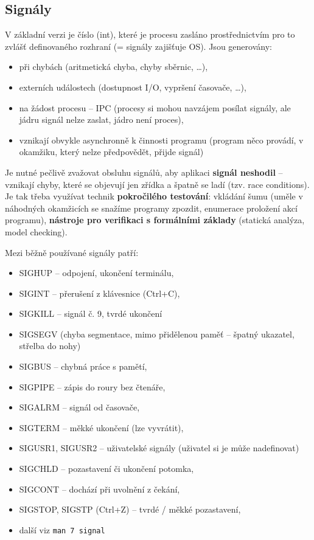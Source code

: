 \documentclass[a4paper, 11pt]{article}
\newcommand{\tcmd}[1]{\texttt{#1}}
\begin{document}
\subsection{Signály}
V základní verzi je číslo (int), které je procesu zasláno prostřednictvím pro to zvlášť definovaného rozhraní (= signály zajišťuje OS). Jsou generovány:
\begin{itemize}
    \item při chybách (aritmetická chyba, chyby sběrnic, \ldots),
    \item externích událostech (dostupnost I/O, vypršení časovače, \ldots),
    \item na žádost procesu -- IPC (procesy si mohou navzájem posílat signály, ale jádru signál nelze zaslat, jádro není proces),
    \item vznikají obvykle asynchronně k činnosti programu (program něco provádí, v okamžiku, který nelze předpovědět, přijde signál) \\
\end{itemize}
 
Je nutné pečlivě zvažovat obsluhu signálů, aby aplikaci \textbf{signál neshodil} -- vznikají chyby, které se objevují jen zřídka a špatně se ladí (tzv. race conditions). Je tak třeba využívat technik \textbf{pokročilého testování}: vkládání šumu (uměle v náhodných okamžicích se snažíme programy zpozdit, enumerace proložení akcí programu), \textbf{nástroje pro verifikaci s formálními základy} (statická analýza, model checking).
 
Mezi běžně používané signály patří:
\begin{itemize}
    \item SIGHUP -- odpojení, ukončení terminálu,
    \item SIGINT -- přerušení z klávesnice (Ctrl+C),
    \item SIGKILL -- signál č. 9, tvrdé ukončení
    \item SIGSEGV (chyba segmentace, mimo přidělenou paměť -- špatný ukazatel, střelba do nohy)
    \item SIGBUS -- chybná práce s pamětí,
    \item SIGPIPE -- zápis do roury bez čtenáře,
    \item SIGALRM -- signál od časovače,
    \item SIGTERM -- měkké ukončení (lze vyvrátit),
    \item SIGUSR1, SIGUSR2 -- uživatelské signály (uživatel si je může nadefinovat)
    \item SIGCHLD -- pozastavení či ukončení potomka,
    \item SIGCONT -- dochází při uvolnění z čekání,
    \item SIGSTOP, SIGSTP (Ctrl+Z) -- tvrdé / měkké pozastavení,
    \item další viz \tcmd{man 7 signal}
\end{itemize}
 
\end{document}

